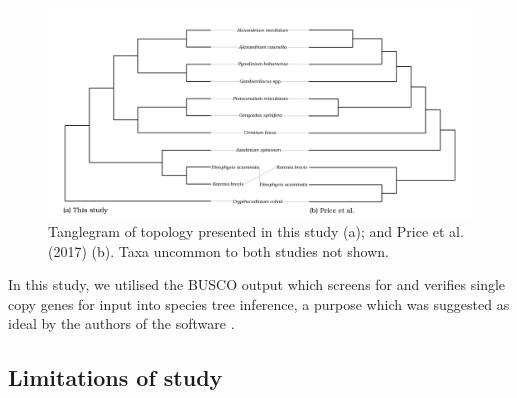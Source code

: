 \documentclass[12pt]{article}
\begin{document}
\FloatBarrier 
\begin{figure} 
\includegraphics[scale=.23]{Price-comparison.png} 
\caption{Tanglegram of topology presented in this study (a); and Price et al. (2017) (b). Taxa uncommon to both studies not shown.} 
\label{fig:tangle}
\end{figure} 
\FloatBarrier
In this study, we utilised the BUSCO output which screens for and verifies single copy genes for input into species tree inference, a purpose which was suggested as ideal by the authors of the software \cite{simao2015busco}. 

\subsection*{Limitations of study}
\end{document}
